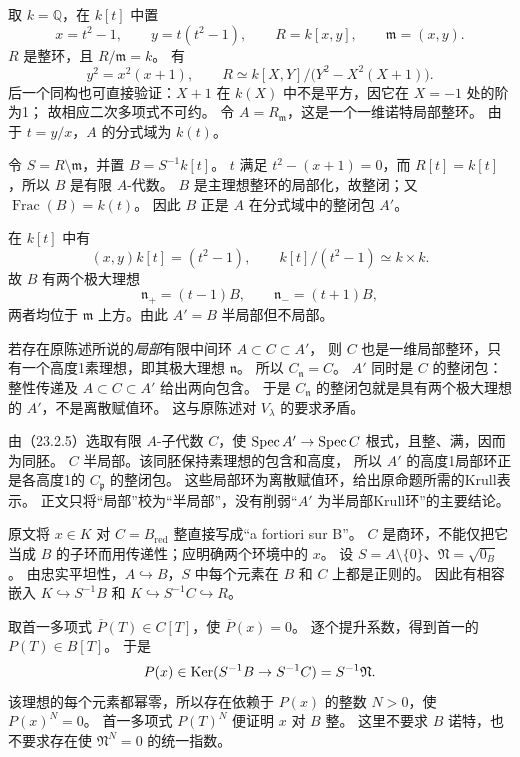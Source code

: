 取 $k=\mathbb Q$，在 $k[t]$ 中置
\[
 x=t^2-1,\qquad y=t(t^2-1),\qquad R=k[x,y],\qquad\mathfrak m=(x,y).
\]
$R$ 是整环，且 $R/\mathfrak m=k$。
有
\[
 y^2=x^2(x+1),\qquad
 R\simeq k[X,Y]/\bigl(Y^2-X^2(X+1)\bigr).
\]
后一个同构也可直接验证：$X+1$ 在 $k(X)$ 中不是平方，因它在 $X=-1$ 处的阶为1；
故相应二次多项式不可约。
令 $A=R_{\mathfrak m}$，这是一个一维诺特局部整环。
由于 $t=y/x$，$A$ 的分式域为 $k(t)$。

令 $S=R\setminus\mathfrak m$，并置 $B=S^{-1}k[t]$。
$t$ 满足 $t^2-(x+1)=0$，而 $R[t]=k[t]$，所以 $B$ 是有限 $A$-代数。
$B$ 是主理想整环的局部化，故整闭；又 $\operatorname{Frac}(B)=k(t)$。
因此 $B$ 正是 $A$ 在分式域中的整闭包 $A'$。

在 $k[t]$ 中有
\[
 (x,y)k[t]=(t^2-1),\qquad
 k[t]/(t^2-1)\simeq k\times k.
\]
故 $B$ 有两个极大理想
\[
 \mathfrak n_+=(t-1)B,\qquad\mathfrak n_-=(t+1)B,
\]
两者均位于 $\mathfrak m$ 上方。由此 $A'=B$ 半局部但不局部。

若存在原陈述所说的\emph{局部}有限中间环 $A\subset C\subset A'$，
则 $C$ 也是一维局部整环，只有一个高度1素理想，即其极大理想 $\mathfrak n$。
所以 $C_{\mathfrak n}=C$。
$A'$ 同时是 $C$ 的整闭包：整性传递及 $A\subset C\subset A'$ 给出两向包含。
于是 $C_{\mathfrak n}$ 的整闭包就是具有两个极大理想的 $A'$，不是离散赋值环。
这与原陈述对 $V_\lambda$ 的要求矛盾。

由（23.2.5）选取有限 $A$-子代数 $C$，使 $\operatorname{Spec} A'\to\operatorname{Spec} C$ 根式，且整、满，因而为同胚。
$C$ 半局部。该同胚保持素理想的包含和高度，
所以 $A'$ 的高度1局部环正是各高度1的 $C_{\mathfrak p}$ 的整闭包。
这些局部环为离散赋值环，给出原命题所需的Krull表示。
正文只将“局部”校为“半局部”，没有削弱“$A'$ 为半局部Krull环”的主要结论。

原文将 $x\in K$ 对 $C=B_{\mathrm{red}}$ 整直接写成“a fortiori sur B”。
$C$ 是商环，不能仅把它当成 $B$ 的子环而用传递性；应明确两个环境中的 $x$。
设 $S=A\setminus\{0\}$、$\mathfrak N=\sqrt{0_B}$。
由忠实平坦性，$A\hookrightarrow B$，$S$ 中每个元素在 $B$ 和 $C$ 上都是正则的。
因此有相容嵌入 $K\hookrightarrow S^{-1}B$ 和 $K\hookrightarrow S^{-1}C\hookrightarrow R$。

取首一多项式 $\overline P(T)\in C[T]$，使 $\overline P(x)=0$。
逐个提升系数，得到首一的 $P(T)\in B[T]$。
于是
\[
 P(x)\in\operatorname{Ker}(S^{-1}B\to S^{-1}C)=S^{-1}\mathfrak N.
\]
该理想的每个元素都幂零，所以存在依赖于 $P(x)$ 的整数 $N>0$，使 $P(x)^N=0$。
首一多项式 $P(T)^N$ 便证明 $x$ 对 $B$ 整。
这里不要求 $B$ 诺特，也不要求存在使 $\mathfrak N^N=0$ 的统一指数。

